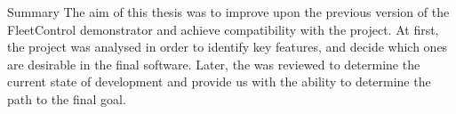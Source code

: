 \chap Summary
The aim of this thesis was to improve upon the previous version of the FleetControl demonstrator and achieve compatibility with the {\mapfIR} project. 
At first, the {\mapfIR} project was analysed in order to identify key features, and decide which ones are desirable in the final software. Later, the {\oldRepo} was reviewed to determine the current state of development and provide us with the ability to determine the path to the final goal. 

 